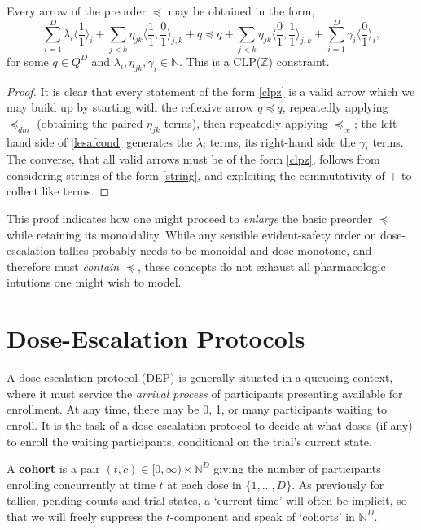 \documentclass{article}
\newcommand{\N}{\mathbb{N}}
\begin{document}
\begin{fact}
  Every arrow of the preorder $\preceq$ may be obtained in the form,
  \begin{equation}
  \sum_{i=1}^D \lambda_i\langle\frac{1}{1}\rangle_i + \sum_{j<k} \eta_{jk}\langle\frac{1}{1},\frac{0}{1}\rangle_{j,k} +q \preceq q + \sum_{j<k} \eta_{jk}\langle\frac{0}{1},\frac{1}{1}\rangle_{j,k} + \sum_{i=1}^D \gamma_i\langle\frac{0}{1}\rangle_i, \label{clpz}
  \end{equation}
  for some $q \in Q^D$ and $\lambda_i, \eta_{jk}, \gamma_i \in \N$.  This is a CLP($\mathbb{Z}$) constraint.
\end{fact}
\begin{proof}
  It is clear that every statement of the form \eqref{clpz} is a valid arrow which we may build up by starting with the reflexive arrow $q \preceq q$, repeatedly applying $\preceq_{dm}$ (obtaining the paired $\eta_{jk}$ terms), then repeatedly applying $\preceq_{ce}$; the left-hand side of \eqref{lesafcond} generates the $\lambda_i$ terms, its right-hand side the $\gamma_i$ terms.
  The converse, that all valid arrows must be of the form \eqref{clpz}, follows from considering strings of the form \eqref{string}, and exploiting the commutativity of $+$ to collect like terms.
\end{proof}

This proof indicates how one might proceed to {\em enlarge} the basic preorder $\preceq$ while retaining its monoidality.  While any sensible evident-safety order on dose-escalation tallies probably needs to be monoidal and dose-monotone, and therefore must {\em contain} $\preceq$, these concepts do not exhaust all pharmacologic intutions one might wish to model.

\section{Dose-Escalation Protocols}

A dose-escalation protocol (DEP) is generally situated in a queueing context, where it must service the {\em arrival process} of participants presenting available for enrollment.  At any time, there may be 0, 1, or many participants waiting to enroll.  It is the task of a dose-escalation protocol to decide at what doses (if any) to enroll the waiting participants, conditional on the trial's current state.

\begin{defn}
  A \textbf{cohort} is a pair $(t,c) \in [0,\infty) \times \N^D$ giving the number of participants enrolling concurrently at time $t$ at each dose in $\{1,...,D\}$.  As previously for tallies, pending counts and trial states, a `current time' will often be implicit, so that we will freely suppress the $t$-component and speak of `cohorts' in $\N^D$.
\end{defn}
\end{document}

